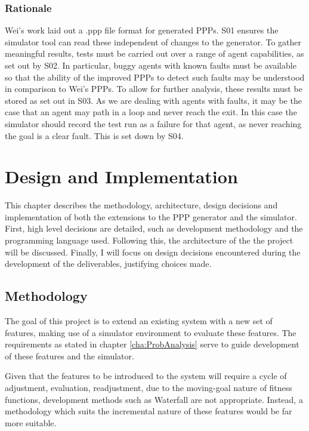 \documentclass[authoryearcitations]{UoYCSproject}
\begin{document}
\subsection{Rationale}
\label{sec:pa5_rat}
Wei's work laid out a .ppp file format for generated PPPs. S01 ensures the simulator tool can read these independent of changes to the generator. To gather meaningful results, tests must be carried out over a range of agent capabilities, as set out by S02. In particular, buggy agents with known faults must be available so that the ability of the improved PPPs to detect such faults may be understood in comparison to Wei's PPPs. To allow for further analysis, these results must be stored as set out in S03. As we are dealing with agents with faults, it may be the case that an agent may path in a loop and never reach the exit. In this case the simulator should record the test run as a failure for that agent, as never reaching the goal is a clear fault. This is set down by S04.

\chapter{Design and Implementation}
\label{cha:Design}

This chapter describes the methodology, architecture, design decisions and implementation of both the extensions to the PPP generator and the simulator. First, high level decisions are detailed, such as development methodology and the programming language used. Following this, the architecture of the the project will be discussed. Finally, I will focus on design decisions encountered during the development of the deliverables, justifying choices made.

\section{Methodology}
\label{sec:da_1}

The goal of this project is to extend an existing system with a new set of features, making use of a simulator environment to evaluate these features. The requirements as stated in chapter \ref{cha:ProbAnalysis} serve to guide development of these features and the simulator.

Given that the features to be introduced to the system will require a cycle of adjustment, evaluation, readjustment, due to the moving-goal nature of fitness functions, development methods such as Waterfall are not appropriate. Instead, a methodology which suits the incremental nature of these features would be far more suitable.
\end{document}
